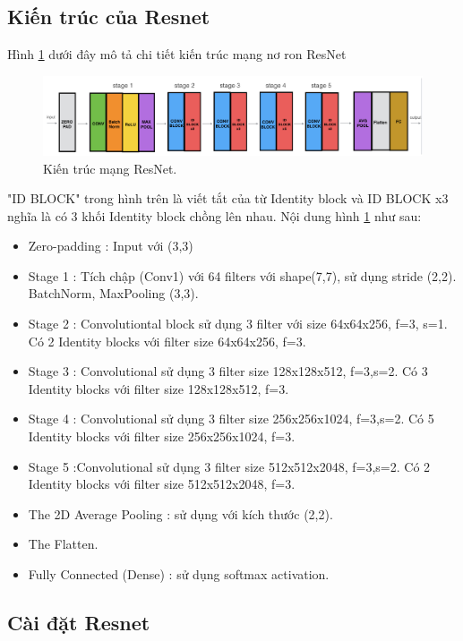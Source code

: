 \subsection{Kiến trúc của Resnet}
Hình \ref{fig:resnet_architecture} dưới đây mô tả chi tiết kiến trúc mạng nơ ron ResNet
\begin{figure}[H]
	\centering
	\includegraphics[width=1\linewidth]{images/resnet_architecture}
	\caption{Kiến trúc mạng ResNet.}
	\label{fig:resnet_architecture}
\end{figure}
"ID BLOCK" trong hình trên là viết tắt của từ Identity block và ID BLOCK x3 nghĩa là có 3 khối Identity block chồng lên nhau. Nội dung hình \ref{fig:resnet_architecture} như sau:
\begin{itemize}
	\item Zero-padding : Input với (3,3)
	\item Stage 1 : Tích chập (Conv1) với 64 filters với shape(7,7), sử dụng stride (2,2). BatchNorm, MaxPooling (3,3).
	\item Stage 2 : Convolutiontal block sử dụng 3 filter với size 64x64x256, f=3, s=1. Có 2 Identity blocks với filter size 64x64x256, f=3.
	\item Stage 3 : Convolutional sử dụng 3 filter size 128x128x512, f=3,s=2. Có 3 Identity blocks với filter size 128x128x512, f=3.
	\item Stage 4 : Convolutional sử dụng 3 filter size 256x256x1024, f=3,s=2. Có 5 Identity blocks với filter size 256x256x1024, f=3.
	\item Stage 5 :Convolutional sử dụng 3 filter size 512x512x2048, f=3,s=2. Có 2 Identity blocks với filter size 512x512x2048, f=3.
	\item The 2D Average Pooling : sử dụng với kích thước (2,2).
	\item The Flatten.
	\item Fully Connected (Dense) : sử dụng softmax activation.
\end{itemize}

\subsection{Cài đặt Resnet}


